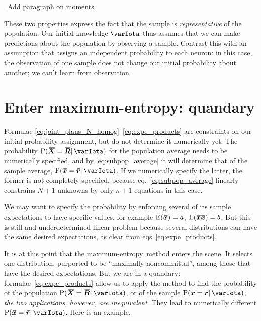 \documentclass{article}
\theoremstyle{remark}
\theoremstyle{innote}
\renewcommand*{\|}{\mathpunct{|}}%
\newcommand*{\p}{\mathrm{P}}%
\newcommand*{\eqn}{eq.}%
\newcommand*{\eqns}{eqs}%
\newcommand*{\E}{\mathrm{E}}
\DeclarePairedDelimiter\expp{(}{)}
\newcommand*{\expe}{\E\expp}%
\theoremstyle{simple}
\newcommand*{\puzzle}{{\fontencoding{U}\fontfamily{fontawesometwo}\selectfont\symbol{225}}}
\newcommand*{\mynote}[1]{ {\color{notecolour}\puzzle\ #1}}
\newcommand*{\widebar}[1]{{\mkern1.5mu\skew{2}\overline{\mkern-1.5mu#1\mkern-1.5mu}\mkern 1.5mu}}
\newcommand*{\av}{\widebar} %
\newcommand*{\sav}{\widebar} %
\newcommand*{\yxx}{x}%
\newcommand*{\yx}{\bm{\yxx}}%
\newcommand*{\yxs}{\sav{\yx}}%
\newcommand*{\yX}{\bm{X}}%
\newcommand*{\yXf}{\av{\yX}}%
\newcommand*{\yxxs}{\sav{\yx\yx}}%
\newcommand*{\yr}{\bm{r}}%
\newcommand*{\yrs}{\sav{\yr}}%
\newcommand*{\yR}{\bm{R}}%
\newcommand*{\yRf}{\av{\yR}}%
\newcommand*{\yH}{\varIota}
\newcommand*{\me}{maximum-entropy}
\begin{document}
\mynote{Add paragraph on moments}

These two properties express the fact that the sample is
\emph{representative} of the population. Our initial knowledge $\yH$ thus
assumes that we can make predictions about the population by observing a
sample. Contrast this with an assumption that assigns an independent
probability to each neuron: in this case, the observation of one sample
does not change our initial probability about another; we can't learn from
observation.

\section{Enter maximum-entropy: quandary}
\label{sec:specific_initial_probability}

Formulae \eqref{eq:joint_plaus_N_homog}--\eqref{eq:expe_products} are
constraints on our initial probability assignment, but do not determine it
numerically yet. The probability $\p(\yXf=\yRf \| \yH)$ for the population
average needs to be numerically specified, and by \eqref{eq:subpop_average}
it will determine that of the sample average, $\p(\yxs=\yrs \| \yH)$. If we
numerically specify the latter, the former is not completely specified,
because \eqn~\eqref{eq:subpop_average} linearly constrains $N+1$ unknowns
by only $n+1$ equations in this case.

We may want to specify the probability by enforcing several of its sample
expectations to have specific values, for example $\expe{\yxs}=a$,
$\expe{\yxxs}=b$. But this is still and underdetermined linear problem
because several distributions can have the same desired expectations, as
clear from \eqns~\eqref{eq:expe_products}.

It is at this point that the \me\ method enters the scene. It selects one
distribution, purported to be \enquote{maximally noncommittal}, among those
that have the desired expectations. But we are in a quandary:
formulae~\eqref{eq:expe_products} allow us to apply the method to find the
probability of the population $\p(\yXf=\yRf \| \yH)$, or of the sample
$\p(\yxs=\yrs \| \yH)$; \emph{the two applications, however, are
  inequivalent}. They lead to numerically different $\p(\yxs=\yrs \| \yH)$.
Here is an example.
\end{document}
